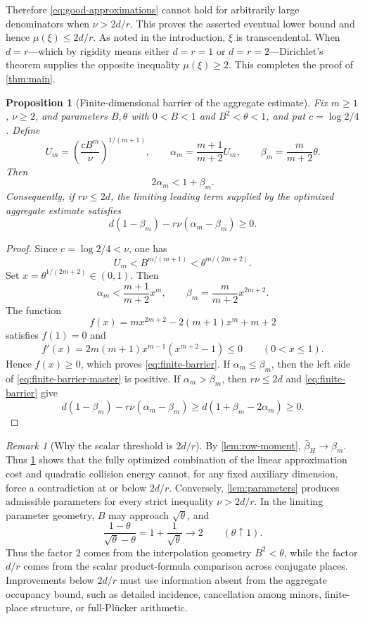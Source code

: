 \documentclass[11pt]{article}
\newtheorem{proposition}[theorem]{Proposition}
\theoremstyle{definition}
\theoremstyle{remark}
\newtheorem{remark}[theorem]{Remark}
\numberwithin{equation}{section}
\begin{document}
Therefore \eqref{eq:good-approximations} cannot hold for arbitrarily
large denominators when $\nu>2d/r$.  This proves the asserted eventual
lower bound and hence $\mu(\xi)\le2d/r$.  As noted in the introduction,
$\xi$ is transcendental.  When $d=r$---which by rigidity means either
$d=r=1$ or $d=r=2$---Dirichlet's theorem supplies the opposite inequality
$\mu(\xi)\ge2$.  This completes the proof of \cref{thm:main}.

\begin{proposition}[Finite-dimensional barrier of the aggregate estimate]
\label{prop:soft-barrier}
Fix $m\ge1$, $\nu\ge2$, and parameters $B,\theta$ with
$0<B<1$ and $B^2<\theta<1$, and put $c=\log2/4$.  Define
\[
 U_m=\left(\frac{cB^m}{\nu}\right)^{1/(m+1)},
 \qquad
 \alpha_m=\frac{m+1}{m+2}U_m,
 \qquad
 \beta_m=\frac{m}{m+2}\theta.
\]
Then
\begin{equation}\label{eq:finite-barrier}
 2\alpha_m<1+\beta_m.
\end{equation}
Consequently, if $r\nu\le2d$, the limiting leading term supplied by the
optimized aggregate estimate satisfies
\begin{equation}\label{eq:finite-barrier-master}
 d(1-\beta_m)-r\nu(\alpha_m-\beta_m)\ge0.
\end{equation}
\end{proposition}

\begin{proof}
Since $c=\log2/4<\nu$, one has
\[
 U_m<B^{m/(m+1)}<\theta^{m/(2m+2)}.
\]
Set $x=\theta^{1/(2m+2)}\in(0,1)$.  Then
\[
 \alpha_m<\frac{m+1}{m+2}x^m,
 \qquad
 \beta_m=\frac{m}{m+2}x^{2m+2}.
\]
The function
\[
 f(x)=mx^{2m+2}-2(m+1)x^m+m+2
\]
satisfies $f(1)=0$ and
\[
 f'(x)=2m(m+1)x^{m-1}(x^{m+2}-1)\le0
 \qquad(0<x\le1).
\]
Hence $f(x)\ge0$, which proves \eqref{eq:finite-barrier}.  If
$\alpha_m\le\beta_m$, then the left side of
\eqref{eq:finite-barrier-master} is positive.  If
$\alpha_m>\beta_m$, then $r\nu\le2d$ and
\eqref{eq:finite-barrier} give
\[
 d(1-\beta_m)-r\nu(\alpha_m-\beta_m)
 \ge d(1+\beta_m-2\alpha_m)\ge0.
\]
\end{proof}

\begin{remark}[Why the scalar threshold is $2d/r$]
By \cref{lem:row-moment}, $\bar\beta_H\to\beta_m$.  Thus
\cref{prop:soft-barrier} shows that the fully optimized combination of
the linear approximation cost and quadratic collision energy cannot,
for any fixed auxiliary dimension, force a contradiction at or below
$2d/r$.  Conversely, \cref{lem:parameters} produces admissible
parameters for every strict inequality $\nu>2d/r$.  In the limiting
parameter geometry, $B$ may approach $\sqrt\theta$, and
\[
 \frac{1-\theta}{\sqrt\theta-\theta}
 =1+\frac1{\sqrt\theta}\longrightarrow2
 \qquad(\theta\uparrow1).
\]
Thus the factor $2$ comes from the interpolation geometry
$B^2<\theta$, while the factor $d/r$ comes from the scalar
product-formula comparison across conjugate places.  Improvements below
$2d/r$ must use information absent from the aggregate occupancy bound,
such as detailed incidence, cancellation among minors, finite-place
structure, or full-Pl\"ucker arithmetic.
\end{remark}
\end{document}
